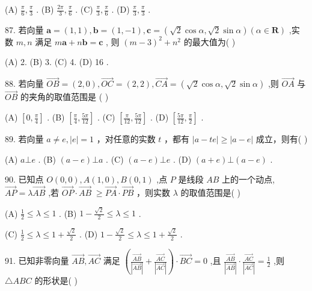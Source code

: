 \documentclass[10pt]{article}
\begin{document}
(A) \(\frac{\pi }{6},\frac{\pi }{3}\) . (B) \(\frac{2\pi }{3},\frac{\pi }{6}\) . (C) \(\frac{\pi }{3},\frac{\pi }{6}\) . (D) \(\frac{\pi }{3},\frac{\pi }{3}\) .

87. 若向量 \(\mathbf{a} = \left( {1,1}\right) ,\mathbf{b} = \left( {1, - 1}\right) ,\mathbf{c} = \left( {\sqrt{2}\cos \alpha ,\sqrt{2}\sin \alpha }\right) \left( {\alpha  \in  \mathbf{R}}\right)\) ,实数 \(m,n\) 满足 \(m\mathbf{a} + n\mathbf{b} = \mathbf{c}\) , 则 \({\left( m - 3\right) }^{2} + {n}^{2}\) 的最大值为( )

(A) 2. (B) 3. (C) 4. (D) 16 .

88. 若向量 \(\overrightarrow{OB} = \left( {2,0}\right) ,\overrightarrow{OC} = \left( {2,2}\right) ,\overrightarrow{CA} = \left( {\sqrt{2}\cos \alpha ,\sqrt{2}\sin \alpha }\right)\) ,则 \(\overrightarrow{OA}\) 与 \(\overrightarrow{OB}\) 的夹角的取值范围是 ( )

(A) \(\left\lbrack  {0,\frac{\pi }{4}}\right\rbrack\) . (B) \(\left\lbrack  {\frac{\pi }{4},\frac{5\pi }{12}}\right\rbrack\) . (C) \(\left\lbrack  {\frac{\pi }{12},\frac{5\pi }{12}}\right\rbrack\) . (D) \(\left\lbrack  {\frac{5\pi }{12},\frac{\pi }{2}}\right\rbrack\) .

89. 若向量 \(a \neq  e,\left| e\right|  = 1\) ，对任意的实数 \(t\) ，都有 \(\left| {a - {te}}\right|  \geq  \left| {a - e}\right|\) 成立，则有( )

(A) \(a \bot  e\) . (B) \(\left( {a - e}\right)  \bot  a\) . (C) \(\left( {a - e}\right)  \bot  e\) . (D) \(\left( {a + e}\right)  \bot  \left( {a - e}\right)\) .

90. 已知点 \(O\left( {0,0}\right) ,A\left( {1,0}\right) ,B\left( {0,1}\right)\) ,点 \(P\) 是线段 \({AB}\) 上的一个动点, \(\overrightarrow{AP} = \lambda \overrightarrow{AB}\) ,若 \(\overrightarrow{OP} \cdot  \overrightarrow{AB} \; \geq  \overrightarrow{PA} \cdot  \overrightarrow{PB}\) ，则实数 \(\lambda\) 的取值范围是( )

(A) \(\frac{1}{2} \leq  \lambda  \leq  1\) . (B) \(1 - \frac{\sqrt{2}}{2} \leq  \lambda  \leq  1\) .

(C) \(\frac{1}{2} \leq  \lambda  \leq  1 + \frac{\sqrt{2}}{2}\) . (D) \(1 - \frac{\sqrt{2}}{2} \leq  \lambda  \leq  1 + \frac{\sqrt{2}}{2}\) .

91. 已知非零向量 \(\overrightarrow{AB},\overrightarrow{AC}\) 满足 \(\left( {\frac{\overrightarrow{AB}}{\left| \overrightarrow{AB}\right| } + \frac{\overrightarrow{AC}}{\left| \overrightarrow{AC}\right| }}\right)  \cdot  \overrightarrow{BC} = 0\) ,且 \(\frac{\overrightarrow{AB}}{\left| \overrightarrow{AB}\right| } \cdot  \frac{\overrightarrow{AC}}{\left| \overrightarrow{AC}\right| } = \frac{1}{2}\) ,则 \(\bigtriangleup {ABC}\) 的形状是( )
\end{document}

